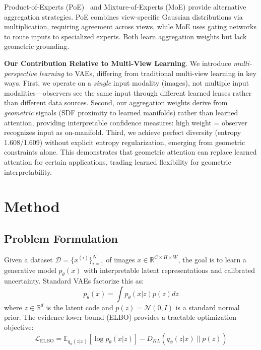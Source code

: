 \documentclass[10pt,twocolumn,letterpaper]{article}
\begin{document}
Product-of-Experts (PoE)~\cite{hinton2002training} and Mixture-of-Experts (MoE) provide alternative aggregation strategies. PoE combines view-specific Gaussian distributions via multiplication, requiring agreement across views, while MoE uses gating networks to route inputs to specialized experts. Both learn aggregation weights but lack geometric grounding.

\textbf{Our Contribution Relative to Multi-View Learning}. We introduce \textit{multi-perspective learning} to VAEs, differing from traditional multi-view learning in key ways. First, we operate on a \textit{single} input modality (images), not multiple input modalities—observers see the same input through different learned lenses rather than different data sources. Second, our aggregation weights derive from \textit{geometric} signals (SDF proximity to learned manifolds) rather than learned attention, providing interpretable confidence measures: high weight = observer recognizes input as on-manifold. Third, we achieve perfect diversity (entropy 1.608/1.609) without explicit entropy regularization, emerging from geometric constraints alone. This demonstrates that geometric attention can replace learned attention for certain applications, trading learned flexibility for geometric interpretability.

\section{Method}

\subsection{Problem Formulation}

Given a dataset $\mathcal{D} = \{x^{(i)}\}_{i=1}^N$ of images $x \in \mathbb{R}^{C \times H \times W}$, the goal is to learn a generative model $p_\theta(x)$ with interpretable latent representations and calibrated uncertainty. Standard VAEs factorize this as:
\begin{equation}
p_\theta(x) = \int p_\theta(x|z) p(z) dz
\end{equation}
where $z \in \mathbb{R}^d$ is the latent code and $p(z) = \mathcal{N}(0, I)$ is a standard normal prior. The evidence lower bound (ELBO) provides a tractable optimization objective:
\begin{equation}
\mathcal{L}_{\text{ELBO}} = \mathbb{E}_{q_\phi(z|x)}[\log p_\theta(x|z)] - D_{KL}(q_\phi(z|x) \| p(z))
\end{equation}
\end{document}
